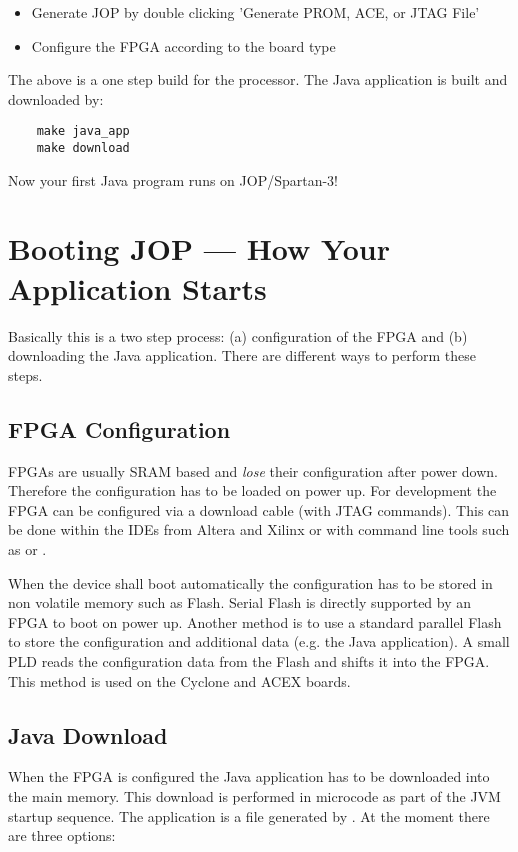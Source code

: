 \begin{itemize}
    \item Generate JOP by double clicking 'Generate PROM, ACE, or JTAG File'
    \item Configure the FPGA according to the board type
\end{itemize}

The above is a one step build for the processor. The Java
application is built and downloaded by:

\begin{verbatim}
    make java_app
    make download
\end{verbatim}

Now your first Java program runs on JOP/Spartan-3!

\section{Booting JOP --- How Your Application Starts}

Basically this is a two step process: (a) configuration of the FPGA
and (b) downloading the Java application. There are different ways
to perform these steps.

\subsection{FPGA Configuration}

FPGAs are usually SRAM based and \emph{lose} their configuration
after power down. Therefore the configuration has to be loaded on
power up. For development the FPGA can be configured via a download
cable (with JTAG commands). This can be done within the IDEs from
Altera and Xilinx or with command line tools such as
 or .

When the device shall boot automatically the configuration has to be
stored in non volatile memory such as Flash. Serial Flash is
directly supported by an FPGA to boot on power up. Another method is
to use a standard parallel Flash to store the configuration and
additional data (e.g. the Java application). A small PLD reads the
configuration data from the Flash and shifts it into the FPGA. This
method is used on the Cyclone and ACEX boards.

\subsection{Java Download}

 When the FPGA is configured the Java
application has to be downloaded into the main memory. This download
is performed in microcode as part of the JVM startup sequence. The
application is a  file generated by . At the
moment there are three options:

